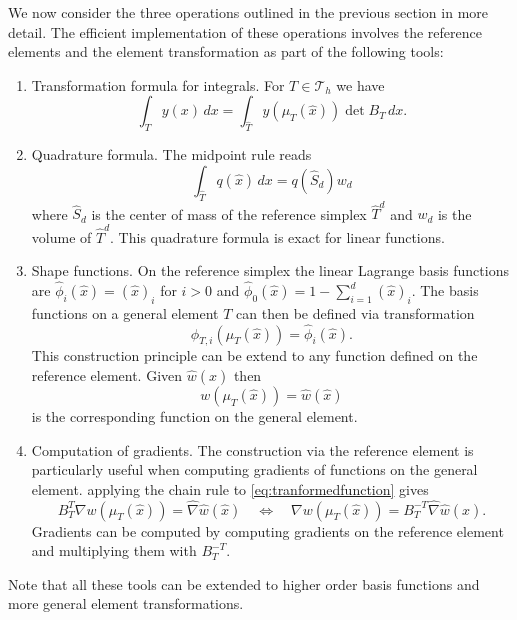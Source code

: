 \documentclass[a4paper,
		     11pt,
		     DIV12,
		     DIVcalc,
		     headings=normal,
		     oneside,
		     bibliography=totoc,
		     headsepline=false,
		     headinclude]{scrartcl}
\begin{document}
We now consider the three operations outlined in the previous section
in more detail. The efficient implementation of these operations involves
the reference elements and the element transformation as part of the following
tools:
\begin{enumerate}[Tool 1)]
\item Transformation formula for integrals. For $T\in\mathcal{T}_h$ we have
\begin{equation*}
\int_T y(x)\,dx = \int_{\hat T} y(\mu_T(\hat x)) \det B_T \,dx .
\end{equation*}
\item Quadrature formula. The midpoint rule reads
\begin{equation*}
\int_{\hat T} q(\hat x) \,dx = q(\hat S_d) w_d
\end{equation*}
where $\hat S_d$ is the center of mass of the reference simplex $\hat T^d$
and $w_d$ is the volume of $\hat T^d$. This quadrature formula is exact for linear
functions.
\item Shape functions. On the reference simplex the linear Lagrange
basis functions are $\hat\phi_i(\hat x) = (\hat x)_i$ for $i>0$ and 
$\hat\phi_0(\hat x) = 1-\sum_{i=1}^d (\hat x)_i$. The basis functions
on a general element $T$ can then be defined via transformation
\begin{equation*}
\phi_{T,i}(\mu_T(\hat x)) = \hat\phi_i(\hat x) .
\end{equation*}
This construction principle can be extend to any function defined on the
reference element. Given $\hat w(\hat x)$ then 
\begin{equation}
w(\mu_T(\hat x))=\hat w(\hat x)
\label{eq:tranformedfunction}
\end{equation}
is the corresponding function on the general element.
\item Computation of gradients. The construction via the reference element
is particularly useful when computing gradients of functions on the general element.
applying the chain rule to \eqref{eq:tranformedfunction} gives
\begin{equation*}
B_T^T \nabla w(\mu_T(\hat x)) = \hat\nabla \hat w(\hat x) \quad\Leftrightarrow\quad
\nabla w(\mu_T(\hat x)) = B_T^{-T}\hat\nabla \hat w(\hat x) .
\end{equation*}
Gradients can be computed by computing gradients on the reference element
and multiplying them with $B_T^{-T}$.
\end{enumerate}
Note that all these tools can be extended to higher order basis functions
and more general element transformations.
\end{document}
